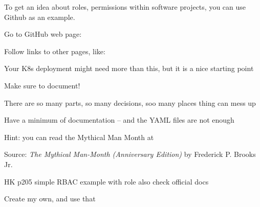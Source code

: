 \documentclass[Screen16to9,17pt]{foils}
\begin{document}



To get an idea about roles, permissions within software projects, you can use Github as an example.

\begin{list2}
\item
Go to GitHub web page:\\
\item Follow links to other pages, like:\\
\item Your K8s deployment might need more than this, but it is a nice starting point
\end{list2}



\begin{list2}
\item Make sure to document!
\item There are so many parts, so many decisions, soo many places thing can mess up
\item Have a minimum of documentation -- and the YAML files are not enough
\item Hint:  you can read the Mythical Man Month at 
\end{list2}


Source: \emph{The Mythical Man-Month (Anniversary Edition)}
by Frederick P. Brooks Jr.

\begin{list2}
    \item
\end{list2}


\begin{list2}
\item HK p205 simple RBAC example with role
also check official docs
\item Create my own, and use that
\end{list2}
\end{document}
